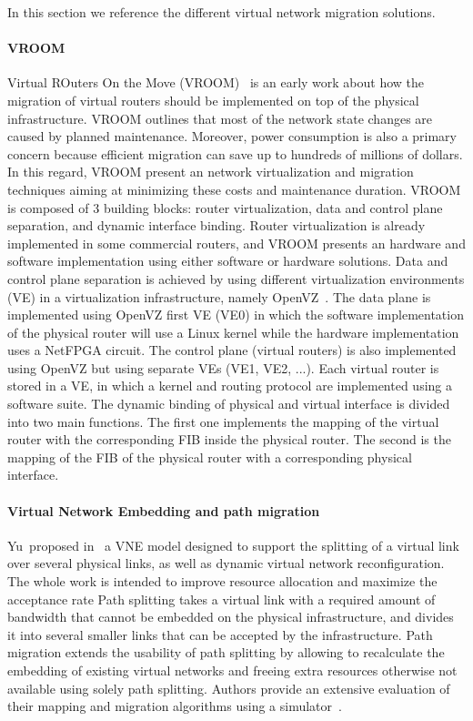 In this section we reference the different virtual network migration solutions.

\paragraph{VROOM}
Virtual ROuters On the Move (VROOM)~\cite{VROOM-Wang2008} is an early work about how the migration of virtual routers should be implemented on top of the physical infrastructure. 
VROOM outlines that most of the network state changes are caused by planned maintenance.
Moreover, power consumption is also a primary concern because efficient migration can save up to hundreds of millions of dollars.
In this regard, VROOM present an network virtualization and migration techniques aiming at minimizing these costs and maintenance duration.
VROOM is composed of 3 building blocks: router virtualization, data and control plane separation, and dynamic interface binding.
Router virtualization is already implemented in some commercial routers, and VROOM presents an hardware and software implementation using either software or hardware solutions.
Data and control plane separation is achieved by using different virtualization environments (VE) in a virtualization infrastructure, namely OpenVZ~\cite{openvz}.
The data plane is implemented using OpenVZ first VE (VE0) in which the software implementation of the physical router will use a Linux kernel while the hardware implementation uses a NetFPGA circuit.
The control plane (\ie virtual routers) is also implemented using OpenVZ but using separate VEs (VE1, VE2, ...).
Each virtual router is stored in a VE, in which a kernel and routing protocol are implemented using a software suite.
The dynamic binding of physical and virtual interface is divided into two main functions.
The first one implements the mapping of the virtual router with the corresponding FIB inside the physical router.
The second is the mapping of the FIB of the physical router with a corresponding physical interface.

\paragraph{Virtual Network Embedding and path migration}
Yu~\etal proposed in~\cite{VNE-Yu2008} a VNE model designed to support the splitting of a virtual link over several physical links, as well as dynamic virtual network reconfiguration.
The whole work is intended to improve resource allocation and maximize the acceptance rate 
Path splitting takes a virtual link with a required amount of bandwidth that cannot be embedded on the physical infrastructure, and divides it into several smaller links that can be accepted by the infrastructure.
Path migration extends the usability of path splitting by allowing to recalculate the embedding of existing virtual networks and freeing extra resources otherwise not available using solely path splitting.
Authors provide an extensive evaluation of their mapping and migration algorithms using a simulator~\cite{vnesimulator}.

